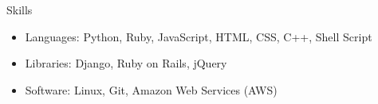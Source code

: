 \documentclass[11pt,oneside]{article}
\newenvironment{ressection}[1]{
    \textrm{\Large#1}
    \begin{itemize}
}{
    \end{itemize}
}
\newcommand{\resitem}[1]{
    \item \begin{flushleft} \textsf{#1} \end{flushleft}
}
\begin{document}
\begin{ressection}{Skills}
    \resitem{
        \textrm{Languages:}
        Python,
        Ruby,
        JavaScript,
        HTML,
        CSS,
        C++,
        Shell Script
    }

    \resitem{
        \textrm{Libraries:}
        Django,
        Ruby on Rails,
        jQuery
    }

    \resitem{
        \textrm{Software:}
        Linux,
        Git,
        Amazon Web Services (AWS)
    }
\end{ressection}
\end{document}
